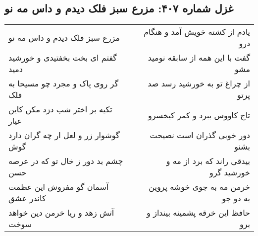 \begin{center}
\section*{غزل شماره ۴۰۷: مزرع سبز فلک دیدم و داس مه نو}
\label{sec:sh407}
\begin{longtable}{l p{0.5cm} r}
مزرع سبز فلک دیدم و داس مه نو
&&
یادم از کشته خویش آمد و هنگام درو
\\
گفتم ای بخت بخفتیدی و خورشید دمید
&&
گفت با این همه از سابقه نومید مشو
\\
گر روی پاک و مجرد چو مسیحا به فلک
&&
از چراغ تو به خورشید رسد صد پرتو
\\
تکیه بر اختر شب دزد مکن کاین عیار
&&
تاج کاووس ببرد و کمر کیخسرو
\\
گوشوار زر و لعل ار چه گران دارد گوش
&&
دور خوبی گذران است نصیحت بشنو
\\
چشم بد دور ز خال تو که در عرصه حسن
&&
بیدقی راند که برد از مه و خورشید گرو
\\
آسمان گو مفروش این عظمت کاندر عشق
&&
خرمن مه به جوی خوشه پروین به دو جو
\\
آتش زهد و ریا خرمن دین خواهد سوخت
&&
حافظ این خرقه پشمینه بینداز و برو
\\
\end{longtable}
\end{center}
